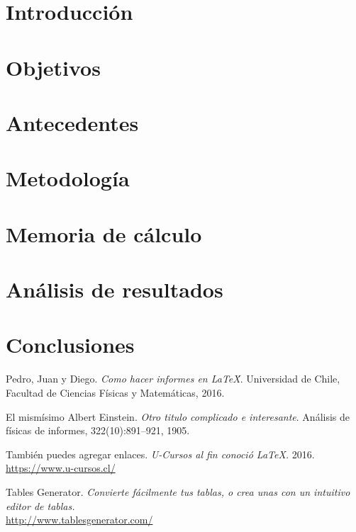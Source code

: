 \documentclass[11pt,letterpaper]{extarticle}        %
\numberwithin{equation}{section}                    %
\begin{document}
\newpage
\setcounter{page}{1}
\thispagestyle{NoPortada}

\section{Introducción}
\section{Objetivos}
\section{Antecedentes}
\section{Metodología}
\section{Memoria de cálculo}
\section{Análisis de resultados}
\section{Conclusiones}










\newpage
\begin{thebibliography}{99}
	
		Pedro, Juan y Diego. 
		\textit{Como hacer informes en \LaTeX\.}. 
		Universidad de Chile, Facultad de Ciencias Físicas y Matemáticas, 2016.
	
		 El mismísimo Albert Einstein. 
		\textit{Otro titulo complicado e interesante}. 
		Análisis de físicas de informes, 322(10):891–921, 1905.
	
		También puedes agregar enlaces.
		\textit{U-Cursos al fin conoció \LaTeX.}
		2016.
		\\\url{https://www.u-cursos.cl/}
	
		Tables Generator.
		\textit{Convierte fácilmente tus tablas, o crea unas con un intuitivo editor de tablas.}
		\\\url{http://www.tablesgenerator.com/}
	
\end{thebibliography}
\end{document}
